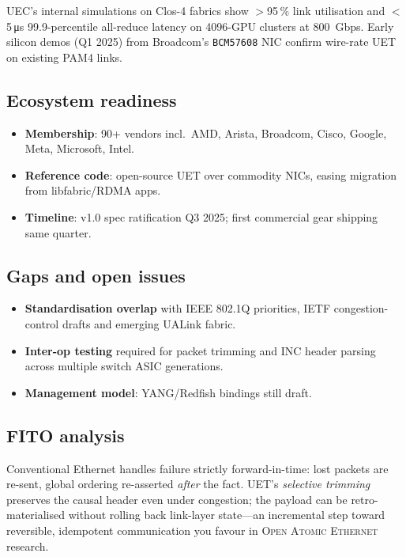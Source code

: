 \documentclass[../../../OAE-SPEC-MAIN.tex]{subfiles}
\begin{document}
UEC’s internal simulations on Clos-4 fabrics show $>$95\,\% link utilisation
and $<$5\,\si{\micro\second} 99.9-percentile all-reduce latency on 4096-GPU
clusters at \SI{800}{Gbps}.
Early silicon demos (Q1 2025) from Broadcom’s
\texttt{BCM57608} NIC confirm wire-rate UET on existing
PAM4 links.

\subsection{Ecosystem readiness}

\begin{itemize}
  \item \textbf{Membership}: 90+ vendors incl.\ AMD, Arista, Broadcom,
        Cisco, Google, Meta, Microsoft, Intel.
  \item \textbf{Reference code}: open-source UET over commodity NICs,
        easing migration from libfabric/RDMA apps.
  \item \textbf{Timeline}: v1.0 spec ratification Q3 2025; first commercial
        gear shipping same quarter.
\end{itemize}

\subsection{Gaps and open issues}
\begin{itemize}
  \item \textbf{Standardisation overlap} with IEEE 802.1Q priorities,
        IETF congestion-control drafts and emerging UALink fabric.
  \item \textbf{Inter-op testing} required for packet trimming and INC
        header parsing across multiple switch ASIC generations.
  \item \textbf{Management model}: YANG/Redfish bindings still draft.
\end{itemize}

\subsection{FITO analysis}
Conventional Ethernet handles failure strictly forward-in-time:
lost packets are re-sent, global ordering re-asserted \emph{after}
the fact. UET’s \emph{selective trimming} preserves the causal
header even under congestion; the payload can be retro-materialised
without rolling back link-layer state—an incremental step toward
reversible, idempotent communication you favour in
\textsc{Open Atomic Ethernet} research.
\end{document}
